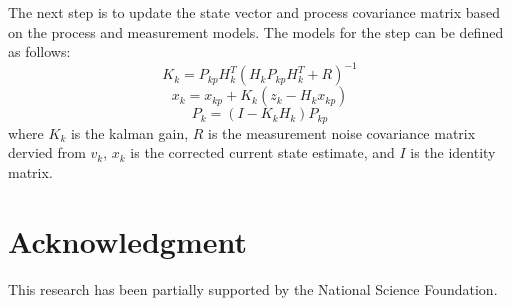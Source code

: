 \documentclass[conference]{IEEEtran}
\begin{document}
The next step is to update the state vector and process covariance matrix based on the process and measurement models. The models for the step can be defined as follows:
\begin{equation}
K_k = P_{kp}H_k^T(H_kP_{kp}H_k^T + R)^{-1}
\end{equation}
\begin{equation}
x_k = x_{kp} + K_k(z_k - H_kx_{kp})
\end{equation}
\begin{equation}
P_k = (I - K_kH_k)P_{kp}
\end{equation}
where $K_k$ is the kalman gain, $R$ is the measurement noise covariance matrix dervied from $v_k$, $x_k$ is the corrected current state estimate, and $I$ is the identity matrix.



\section*{Acknowledgment}
This research has been partially supported by the National Science Foundation.




\end{document}
